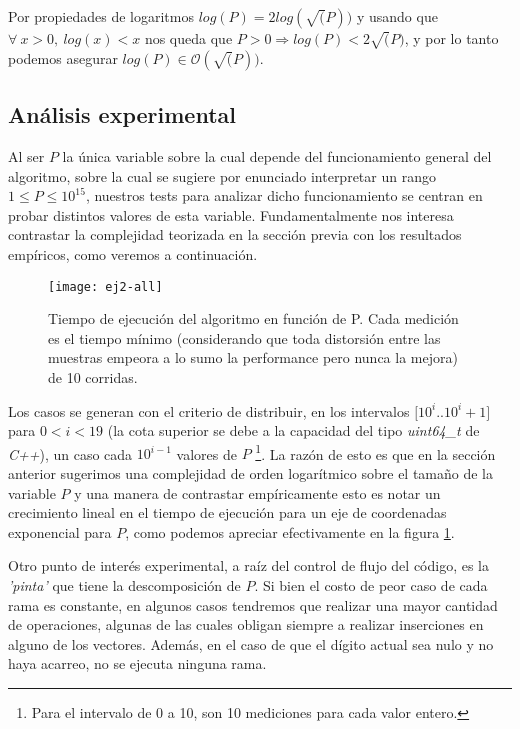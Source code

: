 	Por propiedades de logaritmos $log(P) = 2log(\sqrt(P))$ y usando que $\forall \ x > 0, \ log(x) < x$ nos queda que $ P > 0 \Longrightarrow log(P) < 2\sqrt(P)$, y por lo tanto podemos asegurar $log(P) \in \mathcal{O} (\sqrt(P))$.

\subsection{Análisis experimental}

	Al ser $P$ la única variable sobre la cual depende del funcionamiento general del algoritmo, sobre la cual se sugiere por enunciado interpretar un rango $1 \leq P \leq 10^{15}$, nuestros tests para analizar dicho funcionamiento se centran en probar distintos valores de esta variable. Fundamentalmente nos interesa contrastar la complejidad teorizada en la sección previa con los resultados empíricos, como veremos a continuación.
	\\

\begin{figure}[H]
    \centering
    \texttt{[image: ej2-all]}
    \caption{Tiempo de ejecución del algoritmo en función de P. Cada medición es el tiempo mínimo (considerando que toda distorsión entre las muestras empeora a lo sumo la performance pero nunca la mejora) de 10 corridas.}
    \label{fig:ej2-fig}
\end{figure}

	Los casos se generan con el criterio de distribuir, en los intervalos $[10^i$..$10^i+1]$ para $0 < i < 19$ (la cota superior se debe a la capacidad del tipo \emph{uint64_t} de \emph{C++}), un caso cada $10^{i-1}$ valores de $P$ \footnote{Para el intervalo de 0 a 10, son 10 mediciones para cada valor entero.}. La razón de esto es que en la sección anterior sugerimos una complejidad de orden logarítmico sobre el tamaño de la variable $P$ y una manera de contrastar empíricamente esto es notar un crecimiento lineal en el tiempo de ejecución para un eje de coordenadas exponencial para $P$, como podemos apreciar efectivamente en la figura \ref{fig:ej2-fig}.

	Otro punto de interés experimental, a raíz del control de flujo del código, es la \emph{'pinta'} que tiene la descomposición de $P$. Si bien el costo de peor caso de cada rama es constante, en algunos casos tendremos que realizar una mayor cantidad de operaciones, algunas de las cuales obligan siempre a realizar inserciones en alguno de los vectores. Además, en el caso de que el dígito actual sea nulo y no haya acarreo, no se ejecuta ninguna rama.

